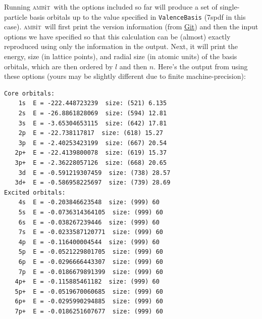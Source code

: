 \documentclass{report}
\newcommand{\ambit}{\textsc{amb}{\footnotesize i}\textsc{t}}
\begin{document}
Running \ambit\  with the options included so far will produce a set of single-particle basis orbitals up
to the value specified in \texttt{ValenceBasis} (7spdf in this case). \ambit\  will first print the 
version information (from \href{https://git-scm.com/}{Git}) and then the input options we have specified
so that this calculation can be (almost) exactly reproduced using only the information in the output.
Next, it will print the energy, size (in lattice points), and radial size (in atomic units) of the basis
orbitals, which are then ordered by $l$ and then $n$. Here's the output from using these options (yours
may be slightly different due to finite machine-precision):

\begin{verbatim}
Core orbitals:                                                                 
    1s  E = -222.448723239  size: (521) 6.135                                  
    2s  E = -26.8861828069  size: (594) 12.81                                  
    3s  E = -3.65304653115  size: (642) 17.81                                  
    2p  E = -22.738117817  size: (618) 15.27                                   
    3p  E = -2.40253423199  size: (667) 20.54                                  
   2p+  E = -22.4139800078  size: (619) 15.37                                  
   3p+  E = -2.36228057126  size: (668) 20.65                                  
    3d  E = -0.591219307459  size: (738) 28.57                                 
   3d+  E = -0.586958225697  size: (739) 28.69                                 
Excited orbitals:                                                              
    4s  E = -0.203846623548  size: (999) 60                                    
    5s  E = -0.0736314364105  size: (999) 60                                   
    6s  E = -0.038267239446  size: (999) 60                                    
    7s  E = -0.0233587120771  size: (999) 60                                   
    4p  E = -0.116400004544  size: (999) 60                                    
    5p  E = -0.0521229801705  size: (999) 60                                   
    6p  E = -0.0296666443307  size: (999) 60                                   
    7p  E = -0.0186679891399  size: (999) 60                                   
   4p+  E = -0.115885461182  size: (999) 60                                    
   5p+  E = -0.0519670060685  size: (999) 60                                   
   6p+  E = -0.0295990294885  size: (999) 60                                   
   7p+  E = -0.0186251607677  size: (999) 60                                   

\end{verbatim}
\end{document}
